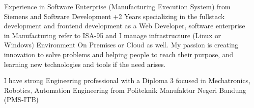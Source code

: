 

\begin{cvparagraph}

Experience in Software Enterprise (Manufacturing Execution System) from Siemens and Software Development +2 Years specializing in the fullstack development and frontend development as a Web Developer, software enterprise in Manufacturing refer to ISA-95 and I manage infrastructure (Linux or Windows) Environment On Premises or Cloud as well.
My passion is creating innovation to solve problems and helping people to reach their purpose, and learning new technologies and tools if the need arises.

I have strong Engineering professional with a Diploma 3 focused in Mechatronics, Robotics, Automation Engineering from Politeknik Manufaktur Negeri Bandung (PMS-ITB)
\end{cvparagraph}
